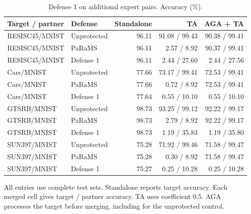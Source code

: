\begin{table}[t]
\centering\small
\setlength{\tabcolsep}{4pt}
\caption{Defense 1 on additional expert pairs. Accuracy (\%).}
\label{tab:defense1_additional_pairs}
\begin{tabular}{@{}llrrr@{}}
\toprule
Target / partner & Defense & Standalone & TA & AGA + TA \\
\midrule
RESISC45/MNIST & Unprotected & 96.11 & 91.08 / 99.43 & 90.38 / 99.41 \\
RESISC45/MNIST & PaRaMS & 96.11 & 2.57 / 8.92 & 90.37 / 99.41 \\
RESISC45/MNIST & Defense 1 & 96.11 & 2.44 / 27.60 & 2.44 / 27.56 \\
\midrule
Cars/MNIST & Unprotected & 77.66 & 73.17 / 99.41 & 72.53 / 99.41 \\
Cars/MNIST & PaRaMS & 77.66 & 0.72 / 8.92 & 72.53 / 99.41 \\
Cars/MNIST & Defense 1 & 77.64 & 0.55 / 10.10 & 0.55 / 10.10 \\
\midrule
GTSRB/MNIST & Unprotected & 98.73 & 93.25 / 99.12 & 92.22 / 99.17 \\
GTSRB/MNIST & PaRaMS & 98.73 & 2.79 / 8.92 & 92.22 / 99.17 \\
GTSRB/MNIST & Defense 1 & 98.73 & 1.19 / 35.83 & 1.19 / 35.80 \\
\midrule
SUN397/MNIST & Unprotected & 75.28 & 71.92 / 99.46 & 71.58 / 99.47 \\
SUN397/MNIST & PaRaMS & 75.28 & 0.30 / 8.92 & 71.58 / 99.47 \\
SUN397/MNIST & Defense 1 & 75.27 & 0.25 / 10.28 & 0.25 / 10.28 \\
\bottomrule
\end{tabular}
\par\smallskip
\begin{minipage}{\textwidth}\footnotesize All entries use complete test sets. Standalone reports target accuracy. Each merged cell gives target / partner accuracy. TA uses coefficient 0.5. AGA processes the target before merging, including for the unprotected control.\end{minipage}
\end{table}
